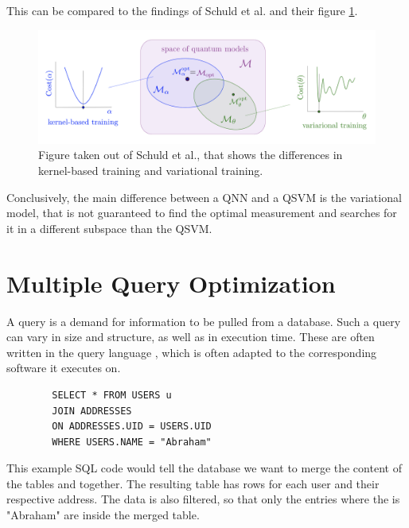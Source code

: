 This can be compared to the findings of Schuld et al.\cite{schuld_SQMLmodelsAreKernelMethods} and their figure \ref{figure:2101.11020_Maria_Schuld_Fig.5}.

\begin{figure}[!h]
    \centering
    \includegraphics[width=1.0\textwidth]{thesis/Figures/qnn/2101.11020_Maria_Schuld_Fig.5.png} 
    \caption{Figure taken out of Schuld et al.\cite{schuld_SQMLmodelsAreKernelMethods}, that shows the differences in kernel-based training and variational training.}
    \label{figure:2101.11020_Maria_Schuld_Fig.5}
\end{figure}

Conclusively, the main difference between a QNN and a QSVM is the variational model, that is not guaranteed to find the optimal measurement and searches for it in a different subspace than the QSVM.

\newpage

\section{Multiple Query Optimization}
\label{chapter:fundamental_multiple_query_optimization}

A query\cite{codd_relational_1970} is a demand for information to be pulled from a database. Such a query can vary in size and structure, as well as in execution time. These are often written in the query language , which is often adapted to the corresponding software\cite{shirgoldbird_microsoft_nodate}\cite{the_postgresql_global_development_group_postgresql_2022} it executes on. 

    
\begin{listing}[!ht]
    \centering
    \begin{verbatim}
        SELECT * FROM USERS u
        JOIN ADDRESSES
        ON ADDRESSES.UID = USERS.UID
        WHERE USERS.NAME = "Abraham"
    \end{verbatim}
    \caption{This example SQL code would tell the database we want to merge the content of the tables  and  together. The resulting table has rows for each user and their respective address. The data is also filtered, so that only the entries where the  is "Abraham" are inside the merged table.}
    \label{figure:sql_query_example}
\end{listing}


